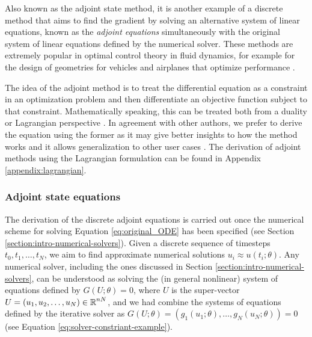 Also known as the adjoint state method, it is another example of a discrete method that aims to find the gradient by solving an alternative system of linear equations, known as the \textit{adjoint equations} simultaneously with the original system of linear equations defined by the numerical solver. 
These methods are extremely popular in optimal control theory in fluid dynamics, for example for the design of geometries for vehicles and airplanes that optimize performance \cite{Elliott_Peraire_1996, Giles_Pierce_2000}.

The idea of the adjoint method is to treat the differential equation as a constraint in an optimization problem and then differentiate an objective function subject to that constraint. 
Mathematically speaking, this can be treated both from a duality or Lagrangian perspective \cite{Giles_Pierce_2000}.
In agreement with other authors, we prefer to derive the equation using the former as it may give better insights to how the method works and it allows generalization to other user cases \cite{Givoli_2021}. 
The derivation of adjoint methods using the Lagrangian formulation can be found in Appendix \ref{appendix:lagrangian}.

\subsubsection{Adjoint state equations}


The derivation of the discrete adjoint equations is carried out once the numerical scheme for solving Equation \eqref{eq:original_ODE} has been specified (see Section \ref{section:intro-numerical-solvers}).  
Given a discrete sequence of timesteps $t_0, t_1, \ldots, t_N$, we aim to find approximate numerical solutions $u_i \approx u(t_i; \theta)$. 
Any numerical solver, including the ones discussed in Section \ref{section:intro-numerical-solvers}, can be understood as solving the (in general nonlinear) system of equations defined by $G(U; \theta) = 0$, where $U$ is the super-vector $U = (u_1, u_2, \ldots, u_N) \in \operatorname{\mathbb{R}}^{nN}$, and we had combine the systems of equations defined by the iterative solver as $G(U; \theta) = (g_1(u_1; \theta), \ldots, g_N(u_N; \theta)) = 0$ (see Equation \eqref{eq:solver-constriant-example}).

